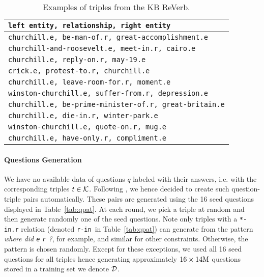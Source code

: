 \documentclass[runningheads,a4paper]{llncs}
\newcommand{\kb}[1]{{\small\texttt{#1}}\xspace}
\newcommand{\rv}{{\sc ReVerb}\xspace}
\begin{document}
\begin{table}[t]
\label{tab:exrv}
\begin{center}
\caption{Examples of triples from the KB \rv.} 
\begin{small}
\begin{tabular}{|l|}
\hline
\multicolumn{1}{|l|}{ {\bf \kb{left entity, relationship, right entity}  }}\\
\hline
\kb{churchill.e, be-man-of.r, great-accomplishment.e}\\
\kb{churchill-and-roosevelt.e, meet-in.r, cairo.e}\\
\kb{churchill.e, reply-on.r, may-19.e}\\
\kb{crick.e, protest-to.r, churchill.e}\\
\kb{churchill.e, leave-room-for.r, moment.e}\\
\kb{winston-churchill.e, suffer-from.r, depression.e}\\
\kb{churchill.e, be-prime-minister-of.r, great-britain.e}\\
\kb{churchill.e, die-in.r, winter-park.e}\\
\kb{winston-churchill.e, quote-on.r, mug.e}\\
\kb{churchill.e, have-only.r, compliment.e}\\
\hline
\end{tabular}
\end{small}
\end{center}
\end{table}


\paragraph{Questions Generation}


We have no available data of questions $q$ labeled with their answers, i.e. with the corresponding triples $t\in{\cal K}$. Following \cite{paralex}, we hence decided to create such question-triple pairs automatically.
These pairs are generated  using the 16 seed questions displayed in Table~\ref{tab:qpat}. 
At each round, we pick a triple at random and then generate randomly one of the seed questions. Note only triples with a \kb{*-in.r} relation (denoted  \kb{r-in} in Table~\ref{tab:qpat}) can generate from the pattern {\it where did \kb{e} \kb{r} ?}, for example, and similar for other constraints. Otherwise, the pattern is chosen randomly.  
Except for these exceptions, we used all 16 seed questions for all triples hence generating approximately $16 \times 14\rm{M}$ questions stored in a training set we denote ${\cal D}$.
\end{document}
